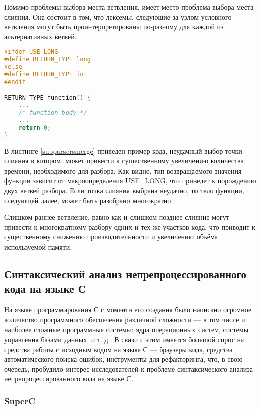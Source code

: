 Помимо проблемы выбора места ветвления, имеет место проблема выбора места слияния. Она состоит в том, что лексемы, следующие за узлом условного ветвления могут быть проинтерпретированы по-разному для каждой из альтернативных ветвей.

\begin{minipage}{\linewidth}
\begin{lstlisting}[caption={Выбор точки слияния подпарсеров оказывает существенное влияние на скорость разбора},label=subparsersmerge,language=C]
#ifdef USE_LONG
#define RETURN_TYPE long
#else
#define RETURN_TYPE int
#endif

RETURN_TYPE function() {
	...
	/* function body */	
	...	
	return 0;
}
\end{lstlisting}
\end{minipage}

В листинге \ref{subparsersmerge} приведен пример кода, неудачный выбор точки слияния в котором, может привести к существенному увеличению количества времени, необходимого для разбора. Как видно, тип возвращаемого значения функции зависит от макроопределения USE\_LONG, что приведет к порождению двух ветвей разбора. Если точка слияния выбрана неудачно, то тело функции, следующей далее, может быть разобрано многократно.


Слишком раннее ветвление, равно как и слишком позднее слияние могут привести к многократному разбору одних и тех же участков кода, что приводит к существенному снижению производительности и увеличению объёма используемой памяти.

\subsection{Синтаксический анализ непрепроцессированного кода на языке С}

На языке программирования С с момента его создания было написано огромное количество программного обеспечения различной сложности --- в том числе и наиболее сложные программные системы: ядра операционных систем, системы управления базами данных, и т. д.. В связи с этим имеется большой спрос на средства работы с исходным кодом на языке С --- браузеры кода, средства автоматического поиска ошибок, инструменты для рефакторинга, что, в свою очередь, пробудило интерес исследователей к проблеме синтаксического анализа непрепроцессированного кода на языке С.

\subsubsection{SuperC}

